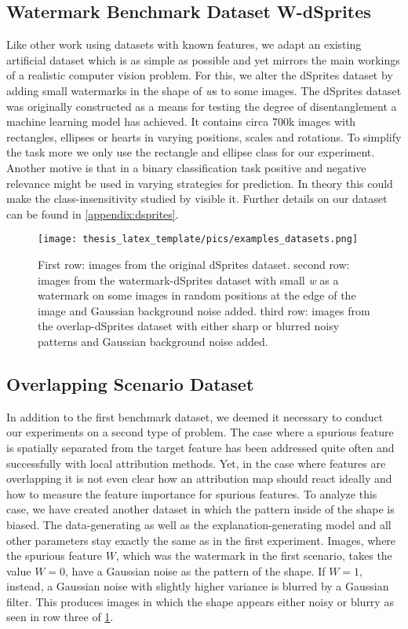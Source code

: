\subsection{Watermark Benchmark Dataset W-dSprites}\label{section:dataset_wdsprites}
Like other work using datasets with known features, we adapt an existing artificial dataset which is as simple as possible and yet mirrors the main workings of a realistic computer vision problem. For this, we alter the dSprites dataset \citep{dsprites17} by adding small watermarks in the shape of \textit{w}s to some images. The dSprites dataset was originally constructed as a means for testing the degree of disentanglement a machine learning model has achieved. It contains circa 700k images with rectangles, ellipses or hearts in varying positions, scales and rotations. To simplify the task more we only use the rectangle and ellipse class for our experiment. Another motive is that in a binary classification task positive and negative relevance might be used in varying strategies for prediction. In theory this could make the class-insensitivity studied by \citet{Sixt2020} visible it. Further details on our dataset can be found in \cref{appendix:dsprites}.

\begin{figure}[t!]
    \centering
    \texttt{[image: thesis\_latex\_template/pics/examples\_datasets.png]}
    \caption[Example Images W-dSprites Watermark Scenario]{First row: images from the original dSprites dataset. 
    second row: images from the watermark-dSprites dataset with small \textit{w} as a watermark on some images in random positions at the edge of the image and Gaussian background noise added. 
    third row: images from the overlap-dSprites dataset with either sharp or blurred noisy patterns and Gaussian background noise added.}
    \label{fig:dsprites_examples}
\end{figure}

\subsection{Overlapping Scenario Dataset}\label{section:dataset_overlap}
In addition to the first benchmark dataset, we deemed it necessary to conduct our experiments on a second type of problem.
The case where a spurious feature is spatially separated from the target feature has been addressed quite often and successfully with local attribution methods. Yet, in the case where features are overlapping it is not even clear how an attribution map should react ideally and how to measure the feature importance for spurious features. To analyze this case, we have created another dataset in which the pattern inside of the shape is biased. The data-generating as well as the explanation-generating model and all other parameters stay exactly the same as in the first experiment.
Images, where the spurious feature $W$, which was the watermark in the first scenario, takes the value $W=0$, have a Gaussian noise as the pattern of the shape. If $W= 1$, instead, a Gaussian noise with slightly higher variance is blurred by a Gaussian filter. This produces images in which the shape appears either noisy or blurry as seen in row three of \cref{fig:dsprites_examples}. 

